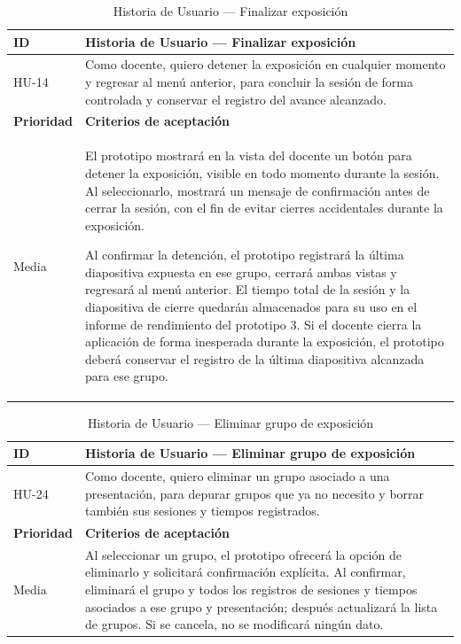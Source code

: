 \documentclass[11pt]{article}
\begin{document}
\begin{table}[H]
    \centering
    \renewcommand{\arraystretch}{1.2}
    \begin{tabular}{|p{2.5cm}|p{11cm}|}
        \hline
        \textbf{ID} & \textbf{Historia de Usuario --- Finalizar exposición} \\
        \hline
        HU-14 & Como docente, quiero detener la exposición en cualquier momento y regresar al menú anterior, para concluir la sesión de forma controlada y conservar el registro del avance alcanzado. \\
        \hline
        \textbf{Prioridad} & \textbf{Criterios de aceptación} \\
        \hline
        Media & El prototipo mostrará en la vista del docente un botón para detener la exposición, visible en todo momento durante la sesión. Al seleccionarlo, mostrará un mensaje de confirmación antes de cerrar la sesión, con el fin de evitar cierres accidentales durante la exposición.

        Al confirmar la detención, el prototipo registrará la última diapositiva expuesta en ese grupo, cerrará ambas vistas y regresará al menú anterior. El tiempo total de la sesión y la diapositiva de cierre quedarán almacenados para su uso en el informe de rendimiento del prototipo 3. Si el docente cierra la aplicación de forma inesperada durante la exposición, el prototipo deberá conservar el registro de la última diapositiva alcanzada para ese grupo. \\
        \hline
    \end{tabular}
    \caption{Historia de Usuario --- Finalizar exposición}
    \label{tab:hu-finalizar-exposicion}
\end{table}

\begin{table}[H]
    \centering
    \renewcommand{\arraystretch}{1.2}
    \begin{tabular}{|p{2.5cm}|p{11cm}|}
        \hline
        \textbf{ID} & \textbf{Historia de Usuario --- Eliminar grupo de exposición} \\
        \hline
        HU-24 & Como docente, quiero eliminar un grupo asociado a una presentación, para depurar grupos que ya no necesito y borrar también sus sesiones y tiempos registrados. \\
        \hline
        \textbf{Prioridad} & \textbf{Criterios de aceptación} \\
        \hline
        Media & Al seleccionar un grupo, el prototipo ofrecerá la opción de eliminarlo y solicitará confirmación explícita. Al confirmar, eliminará el grupo y todos los registros de sesiones y tiempos asociados a ese grupo y presentación; después actualizará la lista de grupos. Si se cancela, no se modificará ningún dato. \\
        \hline
    \end{tabular}
    \caption{Historia de Usuario --- Eliminar grupo de exposición}
    \label{tab:hu-eliminar-grupo-exposicion}
\end{table}
\end{document}
